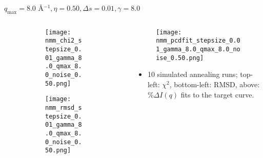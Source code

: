\documentclass{beamer}
\begin{document}
\begin{frame}{$ q_{\textrm{max}}=8.0 $ \AA $^{-1}, \eta=0.50, \Delta s=0.01, \gamma=8.0$}
	\begin{columns}
		\begin{column}{.5\textwidth}
			\begin{figure}[H]
			\centering
			\begin{subfigure}[b]{\textwidth}
				\centering
				\texttt{[image: nmm\_chi2\_stepsize\_0.01\_gamma\_8.0\_qmax\_8.0\_noise\_0.50.png]}
				\label{fig:}
			\end{subfigure}
			\begin{subfigure}[b]{\textwidth}
				\centering
				\texttt{[image: nmm\_rmsd\_stepsize\_0.01\_gamma\_8.0\_qmax\_8.0\_noise\_0.50.png]}
				\label{fig:}
			\end{subfigure}
			\end{figure}
		\end{column}
		\begin{column}{.5\textwidth}
			\begin{figure}[H]
				\centering
				\texttt{[image: nmm\_pcdfit\_stepsize\_0.01\_gamma\_8.0\_qmax\_8.0\_noise\_0.50.png]}
				\label{fig:}
			\end{figure}
			\begin{itemize}
				\item 10 simulated annealing runs; top-left: $\chi^2$, bottom-left: RMSD, above: $\%\Delta I(q)$ fits to the target curve.
			\end{itemize}
		\end{column}
	\end{columns}
\end{frame}
 
\end{document}
